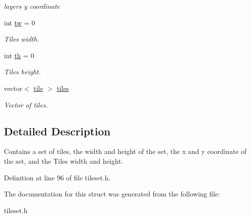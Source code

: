\begin{DoxyCompactItemize}
\begin{DoxyCompactList}\small\item\em layers y coordinate \end{DoxyCompactList}\item 
int \hyperlink{structTileset_1_1layer_adcd99e50219d86c9d63bcc077c9d5874}{tw} = 0\hypertarget{structTileset_1_1layer_adcd99e50219d86c9d63bcc077c9d5874}{}\label{structTileset_1_1layer_adcd99e50219d86c9d63bcc077c9d5874}

\begin{DoxyCompactList}\small\item\em Tiles width. \end{DoxyCompactList}\item 
int \hyperlink{structTileset_1_1layer_a0be4ec31f6366ef7aaef324c7db104a7}{th} = 0\hypertarget{structTileset_1_1layer_a0be4ec31f6366ef7aaef324c7db104a7}{}\label{structTileset_1_1layer_a0be4ec31f6366ef7aaef324c7db104a7}

\begin{DoxyCompactList}\small\item\em Tiles height. \end{DoxyCompactList}\item 
vector$<$ \hyperlink{structTileset_1_1tile}{tile} $>$ \hyperlink{structTileset_1_1layer_a62507e6b900b36e83ac504aa92f44dc1}{tiles}\hypertarget{structTileset_1_1layer_a62507e6b900b36e83ac504aa92f44dc1}{}\label{structTileset_1_1layer_a62507e6b900b36e83ac504aa92f44dc1}

\begin{DoxyCompactList}\small\item\em Vector of tiles. \end{DoxyCompactList}\end{DoxyCompactItemize}


\subsection{Detailed Description}
Contains a set of tiles, the width and height of the set, the x and y coordinate of the set, and the Tiles width and height. 

Definition at line 96 of file tileset.\+h.



The documentation for this struct was generated from the following file\+:\begin{DoxyCompactItemize}
\item 
tileset.\+h\end{DoxyCompactItemize}
